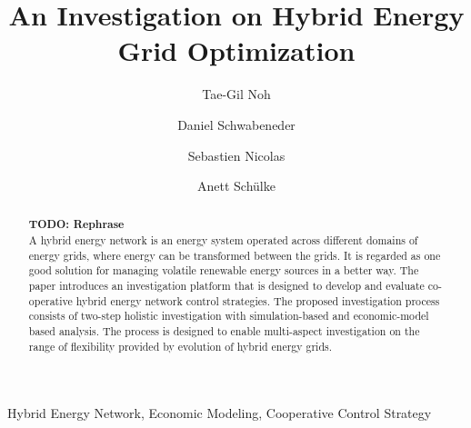 \documentclass[review]{elsarticle}
\begin{document}
\newcommand{\gil}[1]{\textbf{Gil: #1}\\}
\newcommand{\todo}[1]{\textbf{TODO: #1}\\}

\begin{frontmatter}

\title{An Investigation on Hybrid Energy Grid Optimization}




\author[NLE]{Tae-Gil Noh}

\author[TUWien]{Daniel Schwabeneder}

\author[NLE]{Sebastien Nicolas}


\author[NLE]{Anett Sch\"ulke}

\address[NLE]{NEC Laboratories Europe, Kurfuersten-Anlage 36, 69115,
  Heidelberg, Germany}
\address[TUWien]{EEG, TU Wien, Vienna, Austria}


\begin{abstract}
\todo{Rephrase} 
A hybrid energy network is an energy system operated across different
domains of energy grids, where energy can be transformed between the
grids. It is regarded as one good solution for managing volatile
renewable energy sources in a better way.  
The paper introduces an investigation platform that is designed to
develop and evaluate co-operative hybrid energy network control
strategies. The proposed investigation process consists of two-step
holistic investigation with simulation-based and economic-model based
analysis. The process is designed to enable multi-aspect investigation
on the range of flexibility provided by evolution of hybrid energy
grids.
\end{abstract}

\begin{keyword}
Hybrid Energy Network, Economic Modeling, Cooperative Control
Strategy
\end{keyword}

\end{frontmatter}
\end{document}
